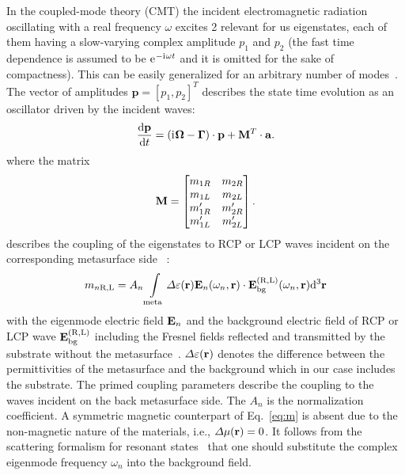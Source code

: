 \documentclass[
    reprint,
    superscriptaddress,
    a4paper,
    amsmath,amssymb,
    prb,
]{revtex4-2}
\newcommand{\iu}{\mathrm{i}\mkern1mu}
\newcommand{\eu}{\mathrm{e}\mkern1mu}
\begin{document}
In the coupled-mode theory (CMT) the incident electromagnetic radiation oscillating with a real frequency $\omega$ excites 2 relevant for us eigenstates, each of them having a slow-varying complex amplitude $p_1$ and $p_2$ (the fast time dependence is assumed to be $\eu^{-\iu \omega t}$ and it is omitted for the sake of compactness). 
This can be easily generalized for an arbitrary number of modes~\cite[Ch.~9]{Shalin2024AllDielectricNanophotonics}.
The vector of  amplitudes $\mathbf{p} = [p_1,p_2]^T$ describes the state time evolution as an oscillator driven by the incident waves:
\begin{equation}\label{CMT1}
	\frac{\dd \vb{p}}{\dd t} =  (\vb{\iu\Omega} - \vb{\Gamma}) \cdot \vb{p} + \vb{M}^T \cdot \vb{a}. 
\end{equation} 
where the matrix
\begin{equation}\label{M}
	{\bf M}=
	\begin{bmatrix}
		m_{1R} & m_{2R}\\
		m_{1L} & m_{2L}\\
		m^{\prime}_{1R} & m^{\prime}_{2R}\\
		m^{\prime}_{1L}& m^{\prime}_{2L}\\ 
	\end{bmatrix}.
\end{equation}
describes the coupling of the eigenstates to RCP or LCP waves incident on the corresponding metasurface side 
~\cite{Weiss2018PRB,Gorkunov2020Aug,koshelev2022PhDthesis,Koshelev2020Science}:
\begin{equation}
	m_{n\text{R,L}} = A_n \int \limits_{\text{meta}} \Delta \varepsilon (\vb{r}) \vb{E}_n (\omega_n, \vb{r}) \cdot \vb{E}_{\text{bg}}^{(\mathrm{R}, \mathrm{L})} (\omega_n, \vb{r}) \dd^{3} \vb{r}
	\label{eq:m}
\end{equation}
with the eigenmode electric field $\vb{E}_n$ and the background electric field of RCP or LCP wave $\vb{E}_{\text{bg}}^{(\mathrm{R},\mathrm{L})}$ including the Fresnel fields reflected and transmitted by the substrate without the metasurface~\cite[Sec.~VI]{Weiss2018PRB}. 
$\Delta \varepsilon (\vb{r})$ denotes the difference between the permittivities of the metasurface and the background which in our case includes the substrate.
The primed coupling parameters describe the coupling to the waves incident on the back metasurface side. 
The $A_n$ is the normalization coefficient. A symmetric magnetic counterpart of Eq.~\eqref{eq:m} is absent due to the non-magnetic nature of the materials, i.e., $\Delta \mu (\vb{r}) =0$.
It follows from the scattering formalism for resonant states~\cite{Weiss2018PRB} that one should substitute the complex eigenmode frequency $\omega_n$ into the background field.
\end{document}
